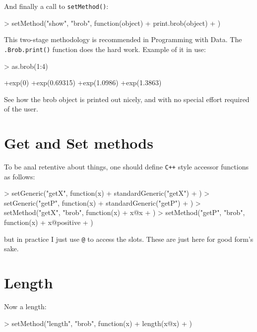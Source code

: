 \documentclass[a4paper]{article}
\begin{document}
And finally a call to {\tt setMethod()}:

\begin{Schunk}
\begin{Sinput}
> setMethod("show", "brob", function(object) {
+     print.brob(object)
+ })
\end{Sinput}
\end{Schunk}

This two-stage methodology is recommended in Programming with Data.
The {\tt .Brob.print()} function does the hard work.  Example of it in
use:

\begin{Schunk}
\begin{Sinput}
> as.brob(1:4)
\end{Sinput}
\begin{Soutput}
[1] +exp(0)       +exp(0.69315) +exp(1.0986)  +exp(1.3863) 
\end{Soutput}
\end{Schunk}

See how the brob object is printed out nicely, and with no special
effort required of the user.


\section{Get and Set methods}

To be anal retentive about things, one should define {\tt C++} style
accessor functions as follows:

\begin{Schunk}
\begin{Sinput}
> setGeneric("getX", function(x) {
+     standardGeneric("getX")
+ })
> setGeneric("getP", function(x) {
+     standardGeneric("getP")
+ })
> setMethod("getX", "brob", function(x) {
+     x@x
+ })
> setMethod("getP", "brob", function(x) {
+     x@positive
+ })
\end{Sinput}
\end{Schunk}

but in practice I just use {\tt @} to access the slots.  These are
just here for good form's sake.


\section{Length}

Now a length:

\begin{Schunk}
\begin{Sinput}
> setMethod("length", "brob", function(x) {
+     length(x@x)
+ })
\end{Sinput}
\end{Schunk}
\end{document}
